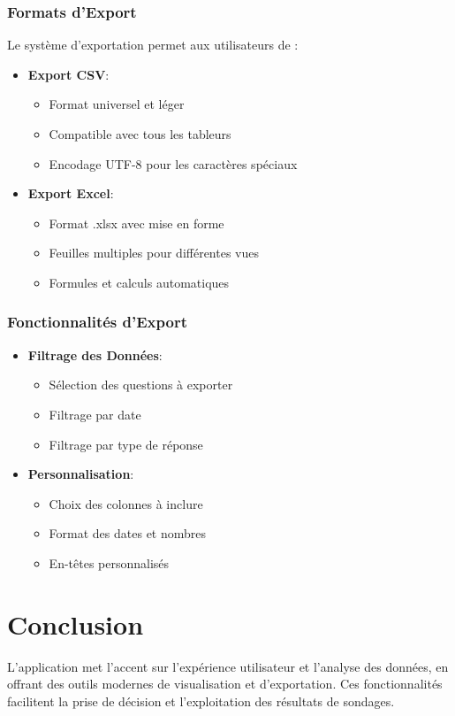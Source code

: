 \documentclass[a4paper,12pt]{report}
\begin{document}
\subsection{Formats d'Export}
Le système d'exportation permet aux utilisateurs de :

\begin{itemize}
    \item \textbf{Export CSV}:
    \begin{itemize}
        \item Format universel et léger
        \item Compatible avec tous les tableurs
        \item Encodage UTF-8 pour les caractères spéciaux
    \end{itemize}
    \item \textbf{Export Excel}:
    \begin{itemize}
        \item Format .xlsx avec mise en forme
        \item Feuilles multiples pour différentes vues
        \item Formules et calculs automatiques
    \end{itemize}
\end{itemize}

\subsection{Fonctionnalités d'Export}
\begin{itemize}
    \item \textbf{Filtrage des Données}:
    \begin{itemize}
        \item Sélection des questions à exporter
        \item Filtrage par date
        \item Filtrage par type de réponse
    \end{itemize}
    \item \textbf{Personnalisation}:
    \begin{itemize}
        \item Choix des colonnes à inclure
        \item Format des dates et nombres
        \item En-têtes personnalisés
    \end{itemize}
\end{itemize}

\chapter{Conclusion}
L'application met l'accent sur l'expérience utilisateur et l'analyse des données, en offrant des outils modernes de visualisation et d'exportation. Ces fonctionnalités facilitent la prise de décision et l'exploitation des résultats de sondages.
\end{document}
